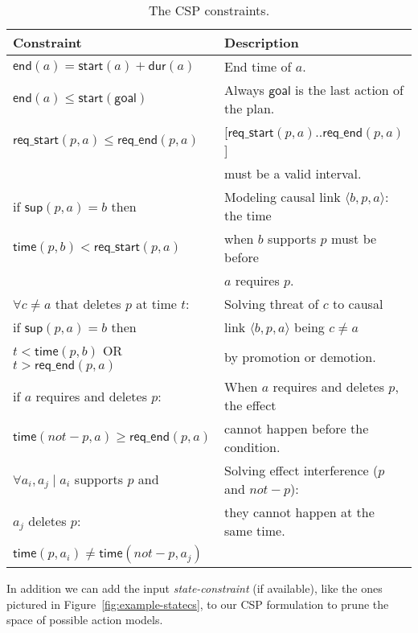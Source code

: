 \documentclass{ecai}
\newcommand{\tup}[1]{{\langle #1 \rangle}}
\newcommand{\dur}{\mathsf{dur}}    %
\newcommand{\start}{\mathsf{start}}%
\newcommand{\en}{\mathsf{end}}     %
\newcommand{\supp}{\mathsf{sup}}   %
\newcommand{\tim}{\mathsf{time}}   %
\newcommand{\reqs}{\mathsf{req\_{start}}} %
\newcommand{\reqe}{\mathsf{req\_{end}}}   %
\newcommand{\goal}{\mathsf{goal}}  %
\begin{document}
\begin{table}
\setlength\extrarowheight{2pt}    
\begin{scriptsize}
\begin{tabular}{ll}
{\bf Constraint} & {\bf Description} \\\hline

$\en(a)=\start(a)+\dur(a)$ & End time of $a$. \\

$\en(a) \leq \start(\goal)$ & Always $\goal$ is the last action of the plan. \\

$\reqs(p,a) \leq \reqe(p,a)$ & [$\reqs(p,a)..\reqe(p,a)$]\\
& must be a valid interval.\\

if $\supp(p,a)=b$ then & Modeling causal link $\tup{b,p,a}$: the time \\
$\tim(p,b) < \reqs(p,a)$ & when $b$ supports $p$ must be before  \\
& $a$ requires $p$. \\

$\forall c \neq a$ that deletes $p$ at time $t$: & Solving threat of $c$ to causal \\
if $\supp(p,a)=b$ then & link $\tup{b,p,a}$ being $c \neq a$ \\
$t < \tim(p,b)$ OR $t > \reqe(p,a)$ & by promotion or demotion.\\

if $a$ requires and deletes $p$: & When $a$ requires and deletes $p$, the effect \\
$\tim(not-p,a) \geq \reqe(p,a)$ & cannot happen before the condition.\\

$\forall a_i,a_j \mid a_i$ supports $p$ and & Solving effect interference ($p$ and $not-p$):\\
$a_j$ deletes $p$: & they cannot happen at the same time.\\
$\tim(p,a_i) \neq \tim(not-p,a_j)$ &
\end{tabular}
\end{scriptsize}
\caption{\small The CSP constraints.}
\label{table:constraints}
\end{table}

In addition we can add the input {\em state-constraint} (if available), like the ones pictured in Figure~\ref{fig:example-statecs}, to our CSP formulation to prune the space of possible action models.
\end{document}
